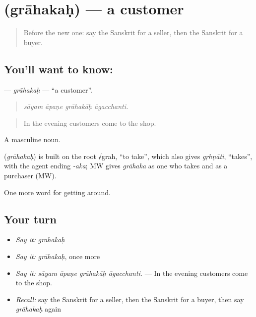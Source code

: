 \section[\texorpdfstring{\sk{ग्राहकः} (grāhakaḥ)}{ग्राहकः (grāhakaḥ)}]{ (grāhakaḥ) — a customer}

\label{lesson:SA-C430-grahakah}



\begin{quote}
Before the new one: say the Sanskrit for a seller, then the Sanskrit for a buyer.
\end{quote}

\subsection*{You'll want to know: }
\textbf{} — \emph{grāhakaḥ} — \textquotedblleft{}a customer\textquotedblright{}.

\begin{quote}
   
\end{quote}

\begin{quote}
\emph{sāyam āpaṇe grāhakāḥ āgacchanti.}
\end{quote}

\begin{quote}
In the evening customers come to the shop.
\end{quote}

A masculine noun.

\begin{cousinweb}
\textbf{} (\emph{grāhakaḥ}) is built on the root √grah, \textquotedblleft{}to take\textquotedblright{}, which also gives \emph{gṛhṇāti}, \textquotedblleft{}takes\textquotedblright{}, with the agent ending \emph{-aka}; MW gives \emph{grāhaka} as one who takes and as a purchaser (MW).
\end{cousinweb}

\begin{grammarlens}[title={What you've built}]
One more word for getting around.
\end{grammarlens}

\subsection*{Your turn}
\begin{itemize}
\raggedright
  \item \emph{Say it:} \emph{grāhakaḥ}
  \item \emph{Say it:} \emph{grāhakaḥ}, once more
  \item \emph{Say it:} \emph{sāyam āpaṇe grāhakāḥ āgacchanti.} — In the evening customers come to the shop.
  \item \emph{Recall:} say the Sanskrit for a seller, then the Sanskrit for a buyer, then say \emph{grāhakaḥ} again
\end{itemize}

